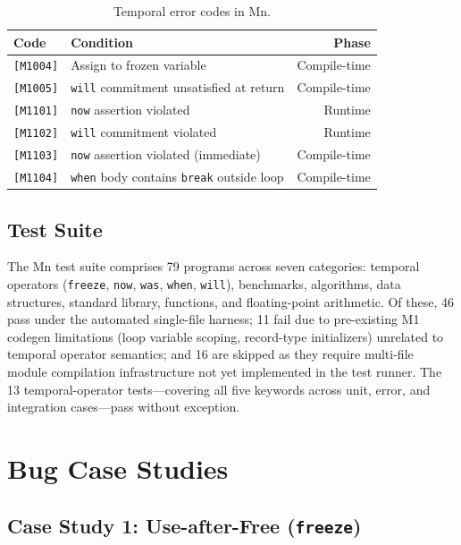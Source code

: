 \documentclass[11pt,a4paper]{article}
\begin{document}
\begin{table}[h]
\centering
\caption{Temporal error codes in Mn.}
\label{tab:errors}
\begin{tabular}{@{}llr@{}}
\toprule
\textbf{Code} & \textbf{Condition} & \textbf{Phase}\\
\midrule
\texttt{[M1004]} & Assign to frozen variable             & Compile-time\\
\texttt{[M1005]} & \texttt{will} commitment unsatisfied at return & Compile-time\\
\texttt{[M1101]} & \texttt{now} assertion violated        & Runtime\\
\texttt{[M1102]} & \texttt{will} commitment violated      & Runtime\\
\texttt{[M1103]} & \texttt{now} assertion violated (immediate) & Compile-time\\
\texttt{[M1104]} & \texttt{when} body contains \texttt{break} outside loop & Compile-time\\
\bottomrule
\end{tabular}
\end{table}

\subsection{Test Suite}

The Mn test suite comprises 79 programs across seven categories:
temporal operators (\texttt{freeze}, \texttt{now}, \texttt{was},
\texttt{when}, \texttt{will}), benchmarks, algorithms, data structures,
standard library, functions, and floating-point arithmetic.
Of these, 46 pass under the automated single-file harness; 11 fail due
to pre-existing M1 codegen limitations (loop variable scoping,
record-type initializers) unrelated to temporal operator semantics;
and 16 are skipped as they require multi-file module compilation
infrastructure not yet implemented in the test runner.
The 13 temporal-operator tests---covering all five keywords across
unit, error, and integration cases---pass without exception.

\section{Bug Case Studies}
\label{sec:casestudies}

\subsection{Case Study 1: Use-after-Free (\texttt{freeze})}
\end{document}
